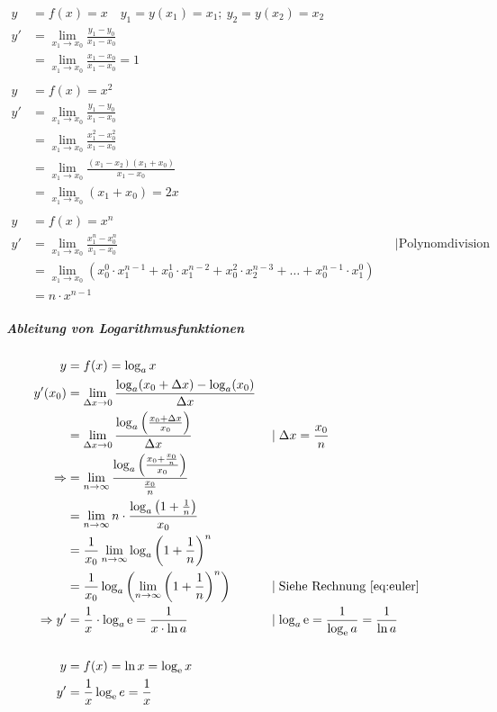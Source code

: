 \begin{align*}
    y &= f(x) = x \quad y_1 = y(x_1) = x_1;\ y_2 = y(x_2) = x_2 \\
    y' &= \lim_{x_1 \rightarrow x_0} \frac{y_1 - y_0}{x_1 - x_0} \\
    &= \lim_{x_1 \rightarrow x_0} \frac{x_1 - x_0}{x_1 - x_0} = 1 \\
    \\
    y &= f(x) = x^2 \\
    y' &= \lim_{x_1 \rightarrow x_0} \frac{y_1 - y_0}{x_1 - x_0} \\
    &= \lim_{x_1 \rightarrow x_0} \frac{x_1^2 - x_0^2}{x_1 - x_0} \\
    &= \lim_{x_1 \rightarrow x_0} \frac{(x_1 - x_2)(x_1 + x_0)}{x_1 - x_0} \\
    &= \lim_{x_1 \rightarrow x_0} (x_1 + x_0) = 2x \\
    \\
    y &= f(x) = x^n \\
    y' &= \lim_{x_1 \rightarrow x_0} \frac{x_1^n - x_0^n}{x_1 - x_0}  &&\mid \text{Polynomdivision} \\
    &= \lim_{x_1 \rightarrow x_0} (x_0^0 \cdot x_1^{n-1} + x_0^1 \cdot x_1^{n-2} + x_0^2 \cdot x_2^{n-3} + \dots + x_0^{n-1} \cdot x_1^0)\\
    &= n \cdot x^{n-1}
\end{align*}

\subparagraph{Ableitung von Logarithmusfunktionen}

\begin{align*}
    y &= f(x) = \log_a x \\
    y'(x_0) &= \lim_{\Delta x \rightarrow 0} \frac{\log_a(x_0 + \Delta x) - \log_a(x_0)}{\Delta x} \\
    &= \lim_{\Delta x \rightarrow 0} \frac{\log_a \left( \frac{x_0 + \Delta x}{x_0} \right)}{\Delta x} &&\mid \Delta x = \frac{x_0}{n} \\
    \Rightarrow &= \lim_{n \rightarrow \infty} \frac{\log_a \left( \frac{x_0 + \frac{x_0}{n}} {x_0} \right)}{\frac{x_0}{n}} \\
    &= \lim_{n \rightarrow \infty} n \cdot \frac{\log_a \left( 1 + \frac{1}{n} \right)}{x_0} \\
    &= \frac{1}{x_0} \lim_{n \rightarrow \infty} \log_a {\left( 1 + \frac{1}{n} \right)}^{n} \\
    &= \frac{1}{x_0} \log_a \left( \lim_{n \rightarrow \infty} {\left( 1 + \frac{1}{n} \right)}^n \right) &&\mid \text{Siehe Rechnung \ref{eq:euler}} \\
    \Rightarrow y' &= \frac{1}{x} \cdot \log_a \mathop{}\!\mathrm{e} = \frac{1}{x \cdot \ln a} &&\mid \log_a \mathop{}\!\mathrm{e} = \frac{1}{\log_{\mathop{}\!\mathrm{e}} a} = \frac{1}{\ln a} \\
    \\
    y &= f(x) = \ln x = \log_{\mathop{}\!\mathrm{e}} x \\
    y' &= \frac{1}{x} \log_{\mathop{}\!\mathrm{e}} e = \frac{1}{x}
\end{align*}


